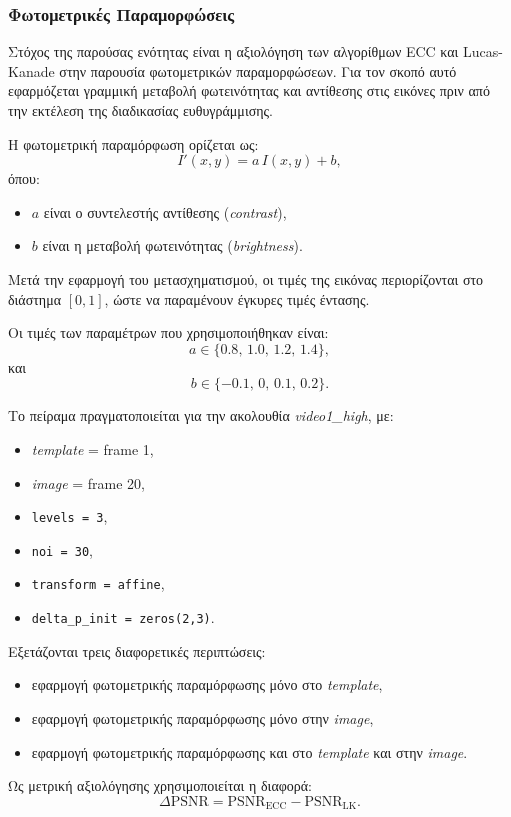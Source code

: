 \documentclass[12pt]{article}
\begin{document}
\subsubsection{Φωτομετρικές Παραμορφώσεις}
Στόχος της παρούσας ενότητας είναι η αξιολόγηση  των αλγορίθμων ECC και Lucas-Kanade στην παρουσία φωτομετρικών παραμορφώσεων. Για τον σκοπό αυτό 
εφαρμόζεται γραμμική μεταβολή φωτεινότητας και αντίθεσης στις εικόνες πριν από την εκτέλεση της διαδικασίας ευθυγράμμισης.

Η φωτομετρική παραμόρφωση ορίζεται ως:
\[
I'(x,y)=a\,I(x,y)+b,
\]
όπου:
\begin{itemize}
    \item \(a\) είναι ο συντελεστής αντίθεσης (\textit{contrast}),
    \item \(b\) είναι η μεταβολή φωτεινότητας (\textit{brightness}).
\end{itemize}

Μετά την εφαρμογή του μετασχηματισμού, οι τιμές της εικόνας περιορίζονται στο διάστημα \([0,1]\), ώστε να παραμένουν έγκυρες τιμές έντασης.

Οι τιμές των παραμέτρων που χρησιμοποιήθηκαν είναι:
\[
a \in \{0.8,\,1.0,\,1.2,\,1.4\},
\]
και
\[
b \in \{-0.1,\,0,\,0.1,\,0.2\}.
\]

Το πείραμα πραγματοποιείται για την ακολουθία \textit{video1\_high}, με:
\begin{itemize}
    \item \textit{template} = frame 1,
    \item \textit{image} = frame 20,
    \item \texttt{levels = 3},
    \item \texttt{noi = 30},
    \item \texttt{transform = affine},
    \item \texttt{delta\_p\_init = zeros(2,3)}.
\end{itemize}

Εξετάζονται τρεις διαφορετικές περιπτώσεις:
\begin{itemize}
    \item εφαρμογή φωτομετρικής παραμόρφωσης μόνο στο \textit{template},
    \item εφαρμογή φωτομετρικής παραμόρφωσης μόνο στην \textit{image},
    \item εφαρμογή φωτομετρικής παραμόρφωσης και στο \textit{template} και στην \textit{image}.
\end{itemize}

Ως μετρική αξιολόγησης χρησιμοποιείται η διαφορά:
\[
\Delta \mathrm{PSNR}
=
\mathrm{PSNR}_{\mathrm{ECC}}
-
\mathrm{PSNR}_{\mathrm{LK}}.
\]
\end{document}
